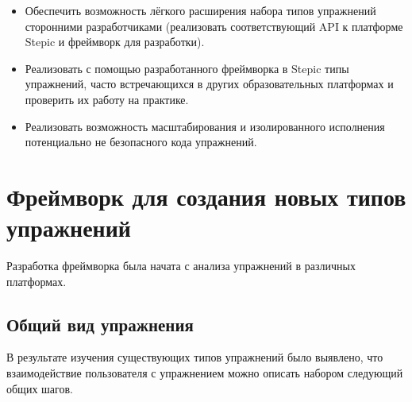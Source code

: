 \documentclass{matmex-diploma-custom}
\begin{document}
\begin{itemize}
\item Обеспечить возможность лёгкого расширения набора типов
  упражнений сторонними разработчиками (реализовать соответствующий
  API к платформе Stepic и фреймворк для разработки).
\item Реализовать с помощью разработанного фреймворка в Stepic типы
  упражнений, часто встречающихся в других образовательных платформах
  и проверить их работу на практике.
\item Реализовать возможность масштабирования и изолированного
  исполнения потенциально не безопасного кода упражнений.
\end{itemize}

\section{Фреймворк для создания новых типов упражнений}
Разработка фреймворка была начата с анализа упражнений в различных
платформах.

\subsection{Общий вид упражнения}
В результате изучения существующих типов упражнений было
выявлено, что взаимодействие пользователя с упражнением можно описать
набором следующий общих шагов.
\end{document}
